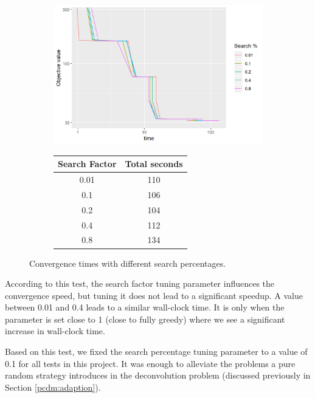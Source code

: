 \begin{figure}[h]
	\centering
	\begin{subfigure}{0.6\linewidth}
		\includegraphics[width=1.0\linewidth]{./chapters/05.pcdm/parameters/searchPercent.png}
	\end{subfigure}
	\begin{subfigure}{0.35\linewidth}
		\begin{tabular}{c | c}
			Search Factor & Total seconds \\ \hline
			0.01 & 110 \\
			0.1 & 106 \\
			0.2 & 104 \\
			0.4 & 112 \\
			0.8 & 134 \\
		\end{tabular}
	\end{subfigure}
	\caption{Convergence times with different search percentages.}
	\label{pcdm:results:search}
\end{figure}

According to this test, the search factor tuning parameter influences the convergence speed, but tuning it does not lead to a significant speedup. A value between 0.01 and 0.4 leads to a similar wall-clock time. It is only when the parameter is set close to 1 (close to fully greedy) where we see a significant increase in wall-clock time.

Based on this test, we fixed the search percentage tuning parameter to a value of 0.1 for all tests in this project. It was enough to alleviate the problems a pure random strategy introduces in the deconvolution problem (discussed previously in Section \ref{pcdm:adaption}).

